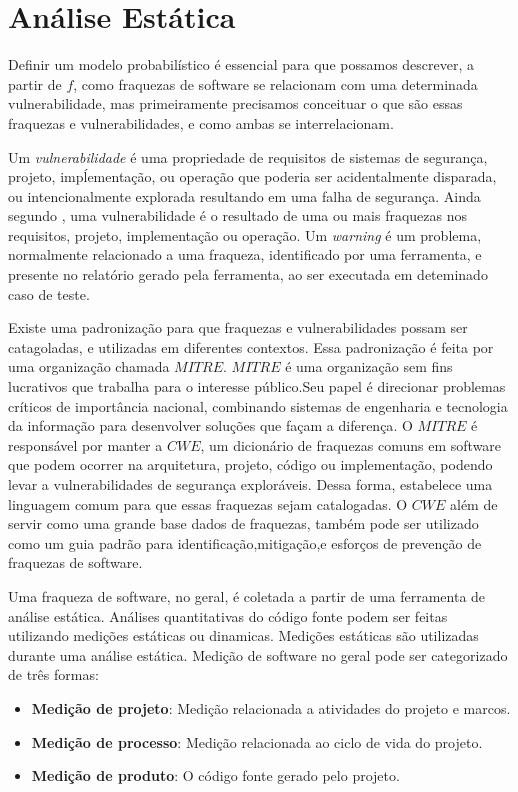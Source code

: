 
\section{Análise Estática}
Definir um modelo probabilístico é essencial para que possamos descrever, a partir de $f$, como fraquezas de software se relacionam com uma determinada
vulnerabilidade, mas primeiramente precisamos conceituar o que são essas fraquezas e vulnerabilidades, e como ambas se interrelacionam.

Um \textit{vulnerabilidade} é uma propriedade de requisitos de sistemas de segurança, projeto, impĺementação, ou operação que poderia ser acidentalmente
disparada, ou intencionalmente explorada resultando em uma falha de segurança\cite{Okun}. Ainda segundo \cite{Okun}, uma vulnerabilidade é o resultado de uma
ou mais fraquezas nos requisitos, projeto, implementação ou operação. Um \textit{warning} é um problema, normalmente relacionado a uma fraqueza, identificado
por uma ferramenta, e presente no relatório gerado pela ferramenta, ao ser executada em deteminado caso de teste\cite{Okun}.


Existe uma padronização para que fraquezas e vulnerabilidades possam ser catagoladas, e utilizadas em diferentes contextos. Essa padronização é feita por uma organização chamada $MITRE$. 
$MITRE$ é uma organização sem fins lucrativos que trabalha para o interesse público.Seu papel é direcionar problemas críticos de importância nacional, combinando sistemas de engenharia e tecnologia da informação para desenvolver soluções que façam a diferença\cite{Mitre}. O $MITRE$ é responsável por manter a $CWE$, um dicionário de fraquezas comuns em software que podem ocorrer na
arquitetura, projeto, código ou implementação, podendo levar a vulnerabilidades de segurança exploráveis. Dessa forma, estabelece uma linguagem comum para que essas fraquezas sejam catalogadas.
O $CWE$ além de servir como uma grande base dados de fraquezas, também pode ser utilizado como um guia padrão para identificação,mitigação,e esforços de prevenção de fraquezas de software\cite{Mitre}.

Uma fraqueza de software, no geral, é coletada a partir de uma ferramenta de análise estática. Análises quantitativas do código fonte podem ser feitas utilizando medições estáticas ou dinamicas. Medições estáticas são utilizadas durante uma análise estática\cite{Fenton}.
Medição de software no geral pode ser categorizado de três formas\cite{Fenton}:
\begin{itemize}
\item \textbf{Medição de projeto}: Medição relacionada a atividades do projeto e marcos.
\item \textbf{Medição de processo}: Medição relacionada ao ciclo de vida do projeto.
\item \textbf{Medição de produto}: O código fonte gerado pelo projeto.
\end{itemize}

